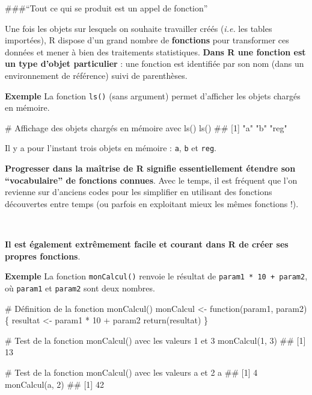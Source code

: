 \documentclass[12pt,twosided, notitlepage]{book}
\newenvironment{Shaded}{}{}
\newcommand{\CommentTok}[1]{\textcolor[rgb]{0.00,0.50,0.00}{#1}}
\newcommand{\ControlFlowTok}[1]{\textcolor[rgb]{0.00,0.00,1.00}{#1}}
\newcommand{\DecValTok}[1]{#1}
\newcommand{\KeywordTok}[1]{\textcolor[rgb]{0.00,0.00,1.00}{#1}}
\newcommand{\NormalTok}[1]{#1}
\newcommand{\OperatorTok}[1]{#1}
\newcommand{\StringTok}[1]{\textcolor[rgb]{0.00,0.50,0.50}{#1}}
\renewenvironment{Shaded}{\begin{snugshade}}{\end{snugshade}}
\begin{document}
\#\#\#\enquote{Tout ce qui se produit est un appel de fonction}

Une fois les objets sur lesquels on souhaite travailler créés
(\emph{i.e.} les tables importées), R dispose d'un grand nombre de
\textbf{fonctions} pour transformer ces données et mener à bien des
traitements statistiques. \textbf{Dans R une fonction est un type
d'objet particulier} : une fonction est identifiée par son nom (dans un
environnement de référence) suivi de parenthèses.

\textbf{Exemple} La fonction \texttt{ls()} (sans
argument) permet d'afficher les objets chargés en mémoire.

\begin{Shaded}
\begin{Highlighting}[]
\CommentTok{# Affichage des objets chargés en mémoire avec ls()}
\KeywordTok{ls}\NormalTok{()}
\NormalTok{  ## [1] "a"   "b"   "reg"}
\end{Highlighting}
\end{Shaded}

Il y a pour l'instant trois objets en mémoire : \texttt{a}, \texttt{b}
et \texttt{reg}.

\textbf{Progresser dans la maîtrise de R signifie essentiellement
étendre son \enquote{vocabulaire} de fonctions connues}. Avec le temps,
il est fréquent que l'on revienne sur d'anciens codes pour les
simplifier en utilisant des fonctions découvertes entre temps (ou
parfois en exploitant mieux les mêmes fonctions !).

~

\textbf{Il est également extrêmement facile et courant dans R de créer
ses propres fonctions}.

\textbf{Exemple} La fonction \texttt{monCalcul()} renvoie le résultat de
\texttt{param1\ *\ 10\ +\ param2}, où \texttt{param1} et \texttt{param2}
sont deux nombres.

\begin{Shaded}
\begin{Highlighting}[]
\CommentTok{# Définition de la fonction monCalcul()}
\NormalTok{monCalcul <-}\StringTok{ }\ControlFlowTok{function}\NormalTok{(param1, param2)\{}
\NormalTok{  resultat <-}\StringTok{ }\NormalTok{param1 }\OperatorTok{*}\StringTok{ }\DecValTok{10} \OperatorTok{+}\StringTok{ }\NormalTok{param2}
  \KeywordTok{return}\NormalTok{(resultat)}
\NormalTok{\}}

\CommentTok{# Test de la fonction monCalcul() avec les valeurs 1 et 3}
\KeywordTok{monCalcul}\NormalTok{(}\DecValTok{1}\NormalTok{, }\DecValTok{3}\NormalTok{)}
\NormalTok{  ## [1] 13}

\CommentTok{# Test de la fonction monCalcul() avec les valeurs a et 2}
\NormalTok{a}
\NormalTok{  ## [1] 4}
\KeywordTok{monCalcul}\NormalTok{(a, }\DecValTok{2}\NormalTok{)}
\NormalTok{  ## [1] 42}
\end{Highlighting}
\end{Shaded}
\end{document}

